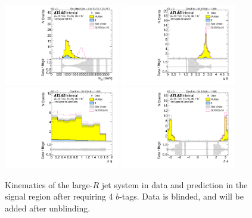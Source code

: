 \begin{figure}[htbp!]
\begin{center}
\includegraphics[width=0.45\textwidth,angle=-90]{figures/boosted/Signal/b77_FourTag_Signal_mHH_l_blind.pdf}
\includegraphics[width=0.45\textwidth,angle=-90]{figures/boosted/Signal/b77_FourTag_Signal_hCandDr_blind.pdf}\\
\includegraphics[width=0.45\textwidth,angle=-90]{figures/boosted/Signal/b77_FourTag_Signal_hCandDeta_blind.pdf}
\includegraphics[width=0.45\textwidth,angle=-90]{figures/boosted/Signal/b77_FourTag_Signal_hCandDphi_blind.pdf}
  \caption{Kinematics of the large-$R$ jet system in data and prediction in the signal region after requiring 4 $b$-tags. Data is blinded, and will be added after unblinding. }
  \label{fig:boosted-4b-signal-blind-ak10-system}
\end{center}
\end{figure}

